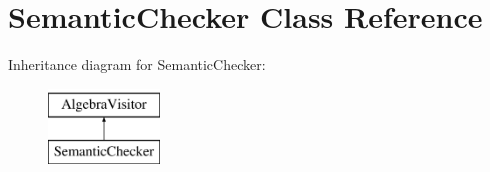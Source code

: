 \hypertarget{class_semantic_checker}{\section{Semantic\+Checker Class Reference}
\label{class_semantic_checker}
}
Inheritance diagram for Semantic\+Checker\+:\begin{figure}[H]
\begin{center}
\leavevmode
\includegraphics[height=2.000000cm]{class_semantic_checker}
\end{center}
\end{figure}
